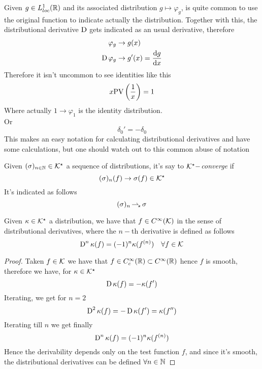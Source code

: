 \documentclass[../complete.tex]{subfiles}
\begin{document}
\begin{ntn}
	Given $g\in L^1_{loc}(\R)$ and its associated distribution $g\mapsto\varphi_g$, is quite common to use the original function to indicate actually the distribution. Together with this, the distributional derivative $\D$ gets indicated as an usual derivative, therefore
	\begin{equation*}
		\begin{aligned}
			\varphi_g&\to g(x)\\
			\D\varphi_g&\to g'(x)=\derivative{g}{x}
		\end{aligned}
	\end{equation*}
	Therefore it isn't uncommon to see identities like this
	\begin{equation*}
		x\cpvdist[]=1
	\end{equation*}
	Where actually $1\to\varphi_1$ is the identity distribution.\\
	Or
	\begin{equation*}
		\delta_0'=-\delta_0
	\end{equation*}
	This makes an easy notation for calculating distributional derivatives and have some calculations, but one should watch out to this common abuse of notation
\end{ntn}
\begin{dfn}
	Given $(\sigma)_{n\in\N}\in\K^\star$ a sequence of distributions, it's say to $\K^\star-$\textit{converge} if
	\begin{equation*}
		(\sigma)_n(f)\to\sigma(f)\in\K^\star
	\end{equation*}
	It's indicated as follows
	\begin{equation*}
		(\sigma)_n\sto\sigma
	\end{equation*}
\end{dfn}
\begin{thm}
	Given $\kappa\in\K^\star$ a distribution, we have that $f\in C^{\infty}(\K)$ in the sense of distributional derivatives, where the $n-$th derivative is defined as follows
	\begin{equation*}
		\D^n\kappa(f)=(-1)^n\kappa(f^{(n)})\quad\forall f\in\K
	\end{equation*}
\end{thm}
\begin{proof}
	Taken $f\in\K$ we have that $f\in C_c^\infty(\R)\subset C^\infty(\R)$ hence $f$ is smooth, therefore we have, for $\kappa\in\K^\star$
	\begin{equation*}
		\D\kappa(f)=-\kappa(f')
	\end{equation*}
	Iterating, we get for $n=2$
	\begin{equation*}
		\D^2\kappa(f)=-\D\kappa(f')=\kappa(f'')
	\end{equation*}
	Iterating till $n$ we get finally
	\begin{equation*}
		\D^n\kappa(f)=(-1)^n\kappa(f^{(n)})
	\end{equation*}
	Hence the derivability depends only on the test function $f$, and since it's smooth, the distributional derivatives can be defined $\forall n\in\N$
\end{proof}
\end{document}
